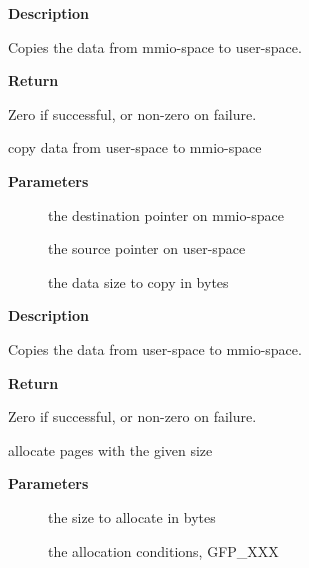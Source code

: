 \documentclass[a4paper,8pt,english]{sphinxmanual}
\begin{document}
\textbf{Description}

Copies the data from mmio-space to user-space.

\textbf{Return}

Zero if successful, or non-zero on failure.

\begin{fulllineitems}
\label{sound/kernel-api/alsa-driver-api:c.copy_from_user_toio}
copy data from user-space to mmio-space

\end{fulllineitems}


\textbf{Parameters}
\begin{description}
\item[{}] \leavevmode
the destination pointer on mmio-space

\item[{}] \leavevmode
the source pointer on user-space

\item[{}] \leavevmode
the data size to copy in bytes

\end{description}

\textbf{Description}

Copies the data from user-space to mmio-space.

\textbf{Return}

Zero if successful, or non-zero on failure.

\begin{fulllineitems}
\label{sound/kernel-api/alsa-driver-api:c.snd_malloc_pages}
allocate pages with the given size

\end{fulllineitems}


\textbf{Parameters}
\begin{description}
\item[{}] \leavevmode
the size to allocate in bytes

\item[{}] \leavevmode
the allocation conditions, GFP\_XXX

\end{description}
\end{document}
